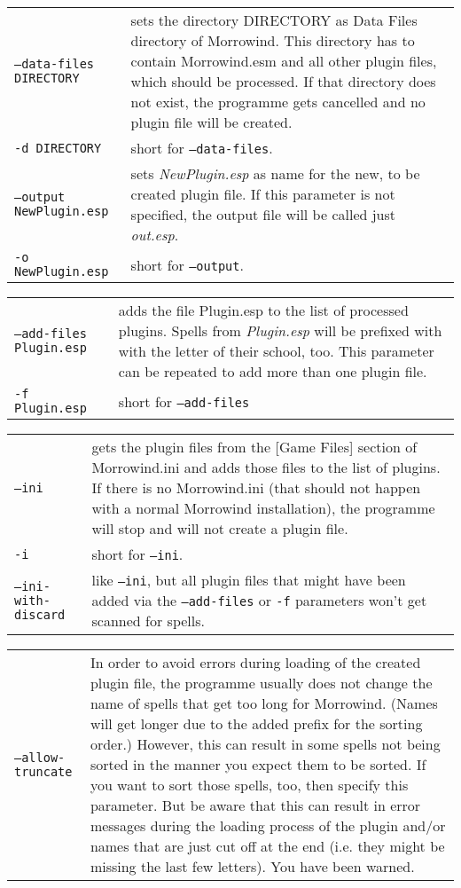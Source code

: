 \documentclass[12pt,oneside,a4paper]{article}
\begin{document}
\begin{tabular}{p{7cm} p{8cm}}
\texttt{--data-files DIRECTORY}   & sets the directory DIRECTORY as Data Files directory of Morrowind. This directory has to contain Morrowind.esm and all other plugin files, which should be processed. If that directory does not exist, the programme gets cancelled and no plugin file will be created.\\
\texttt{-d DIRECTORY}             & short for \texttt{--data-files}.\\
\texttt{--output NewPlugin.esp}   & sets \textit{NewPlugin.esp} as name for the new, to be created plugin file. If this parameter is not specified, the output file will be called just \textit{out.esp}.\\
\texttt{-o NewPlugin.esp}         & short for \texttt{--output}.\\
\end{tabular}
\newline
\begin{tabular}{p{7cm} p{8cm}}
\texttt{--add-files Plugin.esp}   & adds the file Plugin.esp to the list of processed plugins. Spells from \textit{Plugin.esp} will be prefixed with with the letter of their school, too. This pa\-ra\-me\-ter can be repeated to add more than one plugin file.\\
\texttt{-f Plugin.esp}            & short for \texttt{--add-files}\\
\end{tabular}
\newline
\begin{tabular}{p{7cm} p{8cm}}
\texttt{--ini}                    & gets the plugin files from the [Game Files] section of Morrowind.ini and adds those files to the list of plugins. If there is no Morrowind.ini (that should not happen with a normal Morrowind installation), the programme will stop and will not create a plugin file.\\
\texttt{-i}                       & short for \texttt{--ini}.\\
\texttt{--ini-with-discard}       & like \texttt{--ini}, but all plugin files that might have been added via the \texttt{--add-files} or \texttt{-f} parameters won't get scanned for spells.\\
\end{tabular}
\newline
\begin{tabular}{p{7cm} p{8cm}}
\texttt{--allow-truncate}         & In order to avoid errors during loading of the created plugin file, the programme usually does not change the name of spells that get too long for Morrowind. (Names will get longer due to the added prefix for the sorting order.) However, this can result in some spells not being sorted in the manner you expect them to be sorted. If you want to sort those spells, too, then specify this parameter. But be aware that this can result in error messages during the loading process of the plugin and/or names that are just cut off at the end (i.e. they might be missing the last few letters). You have been warned.\\
\end{tabular}
\end{document}
